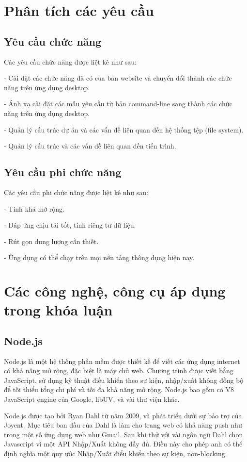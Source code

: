 \documentclass[12pt]{report}
\begin{document}
\section{Phân tích các yêu cầu}
\subsection{Yêu cầu chức năng}
Các yêu cầu chức năng được liệt kê như sau:

- Cài đặt các chức năng đã có của bản website và chuyển đổi thành các chức năng trên ứng dụng desktop.

- Ánh xạ cài đặt các mẫu yêu cầu từ bản command-line sang thành các chức năng trên ứng dụng desktop.

- Quản lý cấu trúc dự án và các vấn đề liên quan đến hệ thống tệp (file system).

- Quản lý cấu trúc và các vấn đề liên quan đến tiến trình.
\subsection{Yêu cầu phi chức năng}
Các yêu cầu phi chức năng được liệt kê như sau:

- Tính khả mở rộng.

- Đáp ứng chịu tải tốt, tính riêng tư dữ liệu.

- Rút gọn dung lượng cần thiết.

- Ứng dụng có thể chạy trên mọi nền tảng thông dụng hiện nay.

\section{Các công nghệ, công cụ áp dụng trong khóa luận}
\subsection{Node.js}
Node.js là một hệ thống phần mềm được thiết kế để viết các ứng dụng internet có khả năng mở rộng, đặc biệt là máy chủ web. Chương trình được viết bằng JavaScript, sử dụng kỹ thuật điều khiển theo sự kiện, nhập/xuất không đồng bộ để tối thiểu tổng chi phí và tối đa khả năng mở rộng. Node.js bao gồm có V8 JavaScript engine của Google, libUV, và vài thư viện khác.

Node.js được tạo bởi Ryan Dahl từ năm 2009, và phát triển dưới sự bảo trợ của Joyent.
Mục tiêu ban đầu của Dahl là làm cho trang web có khả năng push như trong một số ứng dụng web như Gmail. Sau khi thử với vài ngôn ngữ Dahl chọn Javascript vì một API Nhập/Xuất không đầy đủ. Điều này cho phép anh có thể định nghĩa một quy ước Nhập/Xuất điểu khiển theo sự kiện, non-blocking.
\end{document}
